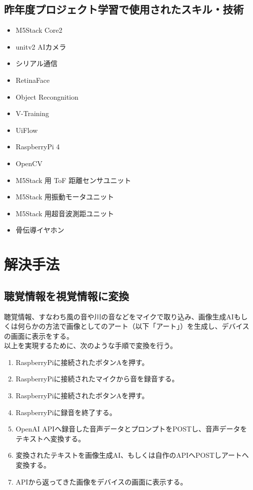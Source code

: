 \documentclass[12pt,a4paper]{report}
\begin{document}
\subsection{昨年度プロジェクト学習で使用されたスキル・技術}
\noindent\space
\begin{itemize}
  \item M5Stack Core2
  \item unitv2 AIカメラ
  \item シリアル通信
  \item RetinaFace
  \item Object Recongnition
  \item V-Training
  \item UiFlow
  \item RaspberryPi 4
  \item OpenCV
  \item M5Stack 用 ToF 距離センサユニット
  \item M5Stack 用振動モータユニット
  \item M5Stack 用超音波測距ユニット
  \item 骨伝導イヤホン
\end{itemize}

\section{解決手法}
\subsection{聴覚情報を視覚情報に変換}
\noindent\space
聴覚情報、すなわち風の音や川の音などをマイクで取り込み、画像生成AIもしくは何らかの方法で画像としてのアート（以下「アート」）を生成し、デバイスの画面に表示をする。\\
以上を実現するために、次のような手順で変換を行う。
\begin{enumerate}
  \item RaspberryPiに接続されたボタンAを押す。
  \item RaspberryPiに接続されたマイクから音を録音する。
  \item RaspberryPiに接続されたボタンAを押す。
  \item RaspberryPiに録音を終了する。
  \item OpenAI APIへ録音した音声データとプロンプトをPOSTし、音声データをテキストへ変換する。
  \item 変換されたテキストを画像生成AI、もしくは自作のAPIへPOSTしアートへ変換する。
  \item APIから返ってきた画像をデバイスの画面に表示する。
\end{enumerate}
\end{document}
